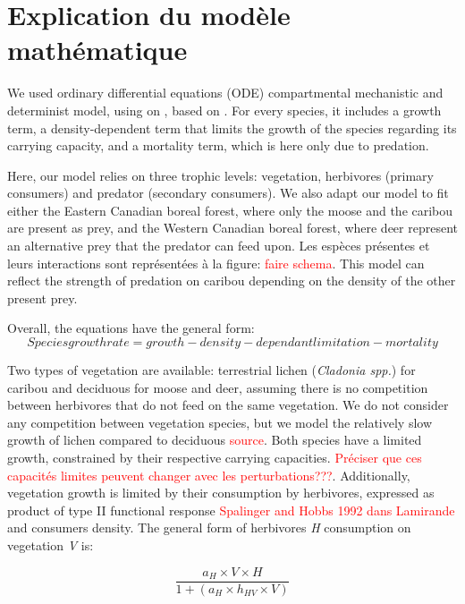 
\section{Explication du modèle mathématique}

We used ordinary differential equations (ODE) compartmental mechanistic and determinist model, using on , based on \cite{lamirande2022}. For every species, it includes a growth term, a density-dependent term that limits the growth of the species regarding its carrying capacity, and a mortality term, which is here only due to predation.

Here, our model relies on three trophic levels: vegetation, herbivores (primary consumers) and predator (secondary consumers). We also adapt our model to fit either the Eastern Canadian boreal forest, where only the moose and the caribou are present as prey, and the Western Canadian boreal forest, where deer represent an alternative prey that the predator can feed upon.  Les espèces présentes et leurs interactions sont représentées à la figure: \textcolor{red}{faire schema}. This model can reflect the strength of predation on caribou depending on the density of the other present prey. 


Overall, the equations have the general form: 
\begin{equation}
    Species growth rate = growth - density-dependant limitation - mortality
\end{equation}

Two types of vegetation are available: terrestrial lichen (\textit{Cladonia spp.}) for caribou and deciduous for moose and deer, assuming there is no competition between herbivores that do not feed on the same vegetation. We do not consider any competition between vegetation species, but we model the relatively slow growth of lichen compared to deciduous \textcolor{red}{source}. Both species have a limited growth, constrained by their respective carrying capacities.
\textcolor{red}{Préciser que ces capacités limites peuvent changer avec les perturbations???}. Additionally, vegetation growth is limited by their consumption by herbivores, expressed as product of type II functional response \textcolor{red}{Spalinger and Hobbs 1992 dans Lamirande} and consumers density. The general form of herbivores \emph{H} consumption on vegetation \emph{V} is: 

\begin{equation}
	\frac{a_H \times V \times H}{1 + (a_H \times h_{HV} \times V)}
	\label{}
\end{equation}

